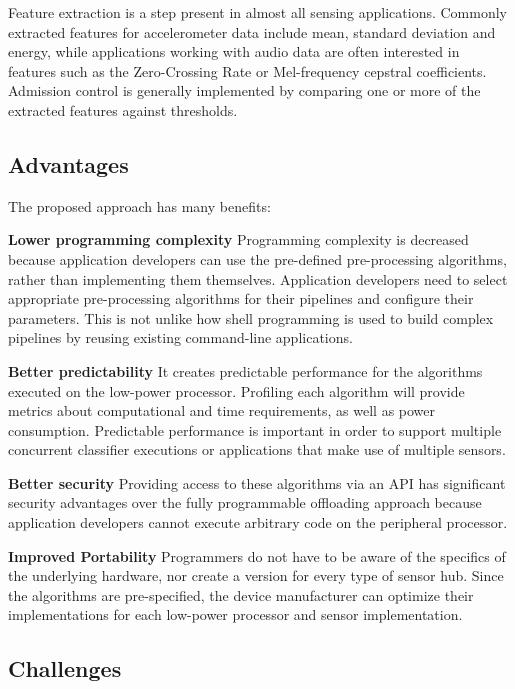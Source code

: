 Feature extraction is a
step present in almost all sensing applications.  Commonly extracted features 
for accelerometer data include mean, standard deviation and energy, while
applications working with audio data are often interested in features such as
the Zero-Crossing Rate or Mel-frequency cepstral coefficients.  Admission 
control is generally implemented by comparing one or more of the
extracted features against thresholds.


\subsection{Advantages}

The proposed approach has many benefits:


 {\bf Lower programming complexity}  Programming complexity is
  decreased because application developers can use the pre-defined
  pre-processing algorithms, rather than implementing them themselves. 
  Application developers need to select appropriate pre-processing 
  algorithms for their pipelines and configure their parameters. This 
  is not unlike how shell programming is used to build complex 
  pipelines by reusing existing command-line applications.
  

{\bf Better predictability} It 
  creates predictable performance for the algorithms executed on the
  low-power processor. Profiling each algorithm will provide metrics
  about computational and time requirements, as well as power
  consumption.  Predictable performance is important in order to
  support multiple concurrent classifier executions or applications
  that make use of multiple sensors.


{\bf Better security} Providing access to these algorithms via
  an API has significant security advantages over the fully
  programmable offloading approach because application developers
  cannot execute arbitrary code on the peripheral processor. 


{\bf Improved Portability} Programmers do not have to be
  aware of the specifics of the underlying hardware, nor  create a version
  for every type of sensor hub. Since the algorithms are
  pre-specified, the device manufacturer can optimize their
  implementations for each low-power processor and sensor
  implementation.



\subsection{Challenges}
\label{sec:challenges}

